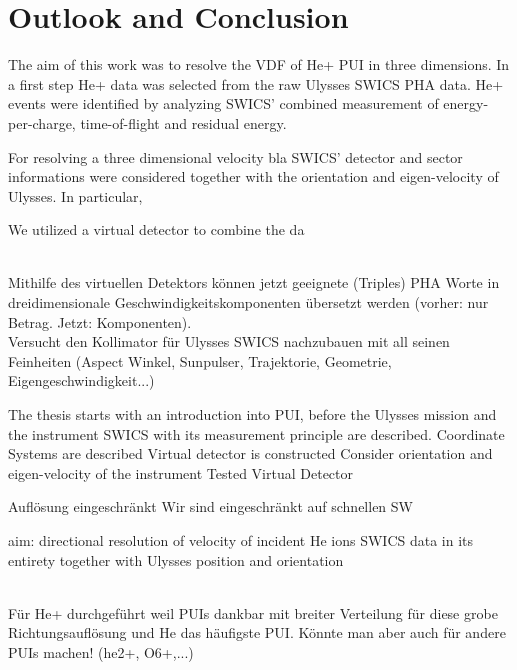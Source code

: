 
\chapter{Outlook and Conclusion} %

\label{chap:concl} %



The aim of this work was to resolve the VDF of He+ PUI in three dimensions.
In a first step He+ data was selected from the raw Ulysses SWICS PHA data. He+ events were identified by analyzing SWICS' combined measurement of energy-per-charge, time-of-flight and residual energy.


For resolving a three dimensional velocity bla SWICS' detector and sector informations were considered together with the orientation and eigen-velocity of Ulysses. In particular, 



We utilized a virtual detector to combine the da

\\
Mithilfe des virtuellen Detektors können jetzt geeignete (Triples) PHA Worte in dreidimensionale Geschwindigkeitskomponenten übersetzt werden (vorher: nur Betrag. Jetzt: Komponenten).
\\
Versucht den Kollimator für Ulysses SWICS nachzubauen mit all seinen Feinheiten (Aspect Winkel, Sunpulser, Trajektorie, Geometrie, Eigengeschwindigkeit...)



The thesis starts with an introduction into PUI, before the Ulysses mission and the instrument SWICS with its measurement principle are described. 
Coordinate Systems are described
Virtual detector is constructed 
Consider orientation and eigen-velocity of the instrument
Tested Virtual Detector


Auflösung eingeschränkt
Wir sind eingeschränkt auf schnellen SW


aim: directional resolution of velocity of incident He ions
SWICS data in its entirety
together with
Ulysses position and orientation 

\\
Für He+ durchgeführt weil PUIs dankbar mit breiter Verteilung für diese grobe Richtungsauflösung und He das häufigste PUI. Könnte man aber auch für andere PUIs machen! (he2+, O6+,...)



